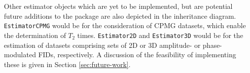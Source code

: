 Other estimator objects which are yet to be implemented, but are potential
future additions to the package are also depicted in the inheritance diagram.
\texttt{EstimatorCPMG} would be for the consideration of \ac{CPMG} datasets,
which enable the determination of $T_2$ times.
\texttt{Estimator2D} and \texttt{Estimator3D} would be
for the estimation of datasets comprising sets of \ac{2D} or \ac{3D} amplitude-
or phase-modulated \acp{FID}, respectively. A discussion of the feasibility of
implementing these is given in Section \ref{sec:future-work}.
